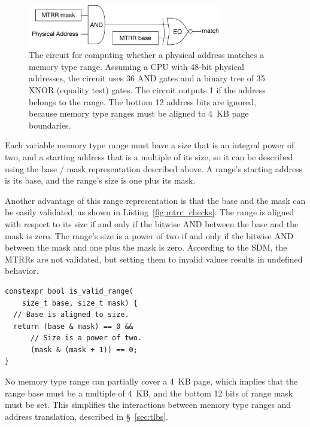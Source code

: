 \begin{figure}[hbt]
  \centering
  \includegraphics[width=85mm]{figures/mtrr_match.pdf}
  \caption{
    The circuit for computing whether a physical address matches a memory type
    range.  Assuming a CPU with 48-bit physical addresses, the circuit uses 36
    AND gates and a binary tree of 35 XNOR (equality test) gates. The circuit
    outputs 1 if the address belongs to the range. The bottom 12 address
    bits are ignored, because memory type ranges must be aligned to 4~KB page
    boundaries.
  }
  \label{fig:mtrr_match}
\end{figure}

Each variable memory type range must have a size that is an integral power of
two, and a starting address that is a multiple of its size, so it can be
described using the base / mask representation described above. A range's
starting address is its base, and the range's size is one plus its mask.

Another advantage of this range representation is that the base and the mask
can be easily validated, as shown in Listing~\ref{fig:mtrr_checks}. The range
is aligned with respect to its size if and only if the bitwise AND between the
base and the mask is zero. The range's size is a power of two if and only if
the bitwise AND between the mask and one plus the mask is zero. According to
the SDM, the MTRRs are not validated, but setting them to invalid values
results in undefined behavior.

\begin{lstlisting}[language={[11]C++}, numbers=none, label={fig:mtrr_checks},
    caption={The checks that validate the base and mask of a memory-type range
             can be implemented very easily.}]
constexpr bool is_valid_range(
    size_t base, size_t mask) {
  // Base is aligned to size.
  return (base & mask) == 0 &&
      // Size is a power of two.
      (mask & (mask + 1)) == 0;
}
\end{lstlisting}

No memory type range can partially cover a 4~KB page, which implies that the
range base must be a multiple of 4~KB, and the bottom 12 bits of range mask
must be set. This simplifies the interactions between memory type ranges and
address translation, described in \S~\ref{sec:tlbs}.


